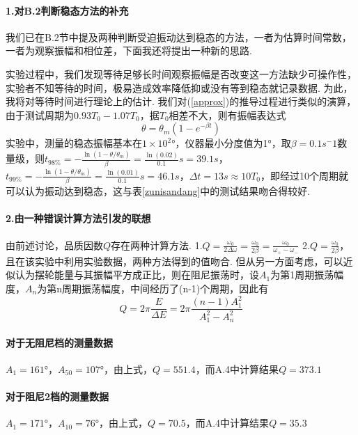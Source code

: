 \documentclass[UTF8]{ctexart}
\begin{document}
\paragraph{1.\quad 对B.2判断稳态方法的补充}\quad\par
我们已在B.2节中提及两种判断受迫振动达到稳态的方法，一者为估算时间常数，一者为观察振幅和相位差，下面我还将提出一种新的思路.\par
实验过程中，我们发现等待足够长时间观察振幅是否改变这一方法缺少可操作性，实验者不知等待的时间，极易造成效率降低抑或没有等到稳态就记录数据. 为此，我将对等待时间进行理论上的估计.
我们对(\ref{approx})的推导过程进行类似的演算，由于测试周期为$0.93T_0-1.07T_0$，据$T_0$相差不大，则有振幅表达式
\begin{equation}
\theta=\theta_m(1-e^{-\beta t})
\end{equation}
实验中，测量的稳态振幅基本在$1\times10^2$°，仪器最小分度值为1°，取$\beta=0.1s^-1$数量级，则$t_{98\%}=-\frac{\ln(1-\theta/\theta_m)}{\beta}=\frac{\ln(0.02)}{0.1}s=39.1s$，$t_{99\%}=-\frac{\ln(1-\theta/\theta_m)}{\beta}=\frac{\ln(0.01)}{0.1}s=46.1s$，$\Delta t=13s\approx10T_0$，即经过10个周期就可以认为振动达到稳态，这与表\ref{zunisandang}中的测试结果吻合得较好.


\paragraph{2.\quad 由一种错误计算方法引发的联想}\quad\par
由前述讨论，品质因数$Q$存在两种计算方法. 1.$\displaystyle{Q=\frac{\omega_0}{2\Delta\omega}=\frac{\omega_0}{2\beta}=\frac{\omega_0}{\omega_{+}-\omega_{-}}}$ 2.$\displaystyle{Q=\frac{\omega_0}{2\beta}}$，且在该实验中利用实验数据，两种方法得到的值吻合. 但从另一方面考虑，可以近似认为摆轮能量与其振幅平方成正比，则在阻尼振荡时，设$A_1$为第1周期振荡幅度，$A_n$为第n周期振荡幅度，中间经历了(n-1)个周期，因此有
\begin{equation}Q=2\pi\frac{E}{\Delta E}=2\pi\frac{(n-1)A_1^2}{A_1^2-A_n^2}\end{equation}
\paragraph{对于无阻尼档的测量数据}$A_1=161$°，$A_50=107$°，由上式，$Q=551.4$，而A.4中计算结果$Q=373.1$
\paragraph{对于阻尼2档的测量数据}$A_1=171$°，$A_10=76$°，由上式，$Q=70.5$，而A.4中计算结果$Q=35.3$
\end{document}
